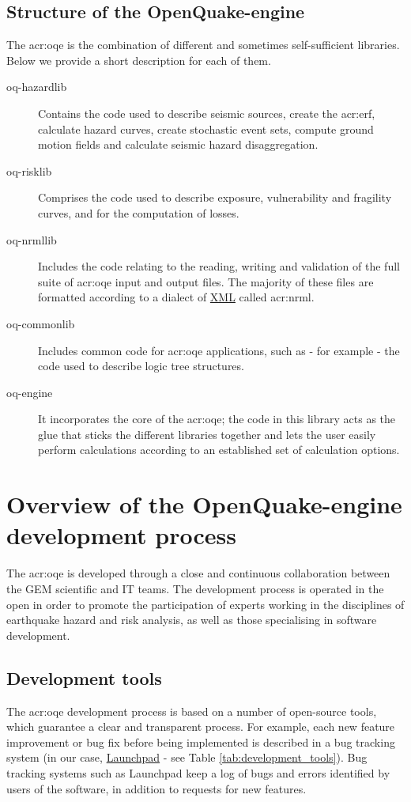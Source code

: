\subsection{Structure of the OpenQuake-engine}
The \gls{acr:oqe} is the combination of different and sometimes 
self-sufficient libraries. Below we provide a short description for each of
them.
\begin{description}
    \item [oq-hazardlib] Contains the code used to describe 
        seismic sources, create the \gls{acr:erf}, calculate hazard curves, 
        create stochastic event sets, compute ground motion fields and 
        calculate seismic hazard disaggregation.
    \item [oq-risklib] Comprises the code used to describe exposure, 
        vulnerability and fragility curves, and for the computation of losses.
    \item [oq-nrmllib] Includes the code relating to the reading, writing and
        validation of the full suite of \gls{acr:oqe} input and output files.
        The majority of these files are formatted according to a dialect of 
        \href{http://www.w3.org/XML/}{XML} called \gls{acr:nrml}. 
    \item [oq-commonlib] Includes common code for \gls{acr:oqe} applications,
        such as - for example - the code used to describe logic tree structures.
    \item [oq-engine] It incorporates the core of the \gls{acr:oqe}; 
        the code in this library acts as the glue that sticks the 
        different libraries together and lets the user easily perform 
        calculations according to an established set of calculation 
        options.
\end{description}
%
\section{Overview of the OpenQuake-engine development process}
%
The \gls{acr:oqe} is developed through a close and continuous collaboration
between the GEM scientific and IT teams. The development process is operated in
the open in order to promote the participation of experts working in the
disciplines of earthquake hazard and risk analysis, as well as those
specialising in software development.
%
\subsection{Development tools}
%
The \gls{acr:oqe} development process is based on a number of open-source
tools, which guarantee a clear and transparent process. 
%
For example, each new feature improvement or bug fix before being implemented 
is described in a bug tracking system (in our case,
\href{https://launchpad.net/}{Launchpad} - see Table
\ref{tab:development_tools}). 
%
Bug tracking systems such as Launchpad keep a log of bugs and errors identified
by users of the software, in addition to requests for new features.

